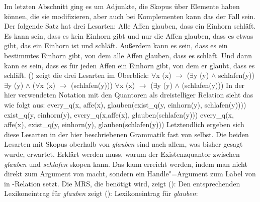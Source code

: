 Im letzten Abschnitt ging es um Adjunkte, die Skopus über Elemente haben können, die sie
modifizieren, aber auch bei Komplementen kann das der Fall sein. Der folgende Satz hat drei Lesarten:
\ea
Alle Affen glauben, dass ein Einhorn schläft.
\z
Es kann sein, dass es kein Einhorn gibt und nur die Affen glauben, dass es etwas gibt, das ein
Einhorn ist und schläft. Außerdem kann es sein, dass es ein bestimmtes Einhorn gibt, von dem alle
Affen glauben, dass es schläft. Und dann kann es sein, dass es für jeden Affen ein Einhorn gibt, von
dem er glaubt, dass es schläft. () zeigt die drei Lesarten im Überblick:
\eal
\label{ex-Prädikatenlogik-alle-Affen-glauben-dass-ein-Einhorn-schläft}
\ex $\forall$x (x) $\to$ ($\exists$y (y) $\wedge$ schlafen(y))
\ex $\exists$y (y) $\wedge$ ($\forall$x (x) $\to$ (schlafen(y)))
\ex $\forall$x (x) $\to$ ($\exists$y (y) $\wedge$ (schlafen(y)))
\zl
In der hier verwendeten Notation mit den Quantoren als dreistelliger Relation sieht das wie folgt aus:
\eal
\label{ex-Quantoren-Relationen-alle-Affen-glauben-dass-ein-Einhorn-schläft}
\ex every\_q(x, affe(x), glauben(exist\_q(y, einhorn(y), schlafen(y))))
\ex exist\_q(y, einhorn(y), every\_q(x,affe(x), glauben(schlafen(y)))
\ex every\_q(x, affe(x), exist\_q(y, einhorn(y), glauben(schlafen(y)))
\zl
Letztendlich ergeben sich diese Lesarten in der hier beschriebenen Grammatik fast von selbst. Die
beiden Lesarten mit Skopus oberhalb von \emph{glauben} sind nach allem, was bisher gesagt wurde,
erwartet. Erklärt werden muss, warum der Existenzquantor zwischen \emph{glauben} und \emph{schlafen}
skopen kann. Das kann erreicht werden, indem man nicht  direkt zum Argument von
 macht, sondern ein Handle"=Argument zum Label von  in
\qeq-Relation setzt. Die MRS, die benötigt wird, zeigt ():
\ea
{}
\z
Den entsprechenden Lexikoneintrag für \emph{glauben} zeigt ():
\eas
\label{le-glauben}%
Lexikoneintrag für \emph{glauben}:\\
\ms

